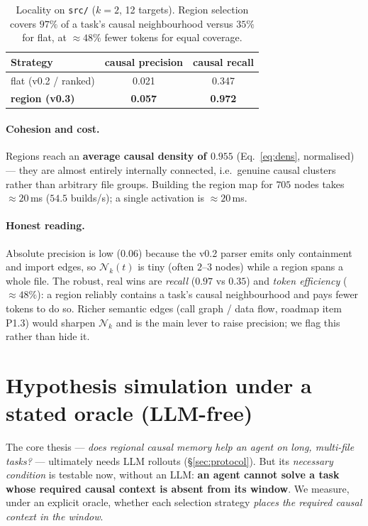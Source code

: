 \documentclass[11pt]{article}
\newcommand{\Nk}{\mathcal{N}_k}
\newcommand{\code}[1]{\texttt{#1}}
\begin{document}
\begin{table}[h]
\centering
\begin{tabular}{lcc}
\toprule
Strategy & causal precision & causal recall \\
\midrule
flat (v0.2 / ranked) & 0.021 & 0.347 \\
\textbf{region (v0.3)} & \textbf{0.057} & \textbf{0.972} \\
\bottomrule
\end{tabular}
\caption{Locality on \code{src/} ($k=2$, 12 targets). Region selection covers
$97\%$ of a task's causal neighbourhood versus $35\%$ for flat, at
$\approx\!48\%$ fewer tokens for equal coverage.}
\label{tab:locality}
\end{table}

\paragraph{Cohesion and cost.} Regions reach an \textbf{average causal density of
$0.955$} (Eq.~\ref{eq:dens}, normalised) --- they are almost entirely internally
connected, i.e.\ genuine causal clusters rather than arbitrary file groups.
Building the region map for $705$ nodes takes $\approx\!20$\,ms
($54.5$ builds/s); a single activation is $\approx\!20$\,ms.

\paragraph{Honest reading.} Absolute precision is low ($0.06$) because the v0.2
parser emits only containment and import edges, so $\Nk(t)$ is tiny (often $2$--$3$
nodes) while a region spans a whole file. The robust, real wins are
\emph{recall} ($0.97$ vs $0.35$) and \emph{token efficiency} ($\approx\!48\%$):
a region reliably contains a task's causal neighbourhood and pays fewer tokens to
do so. Richer semantic edges (call graph / data flow, roadmap item P1.3) would
sharpen $\Nk$ and is the main lever to raise precision; we flag this rather than
hide it.

\section{Hypothesis simulation under a stated oracle (LLM-free)}\label{sec:sim}

The core thesis --- \emph{does regional causal memory help an agent on long,
multi-file tasks?} --- ultimately needs LLM rollouts (\S\ref{sec:protocol}). But
its \emph{necessary condition} is testable now, without an LLM: \textbf{an agent
cannot solve a task whose required causal context is absent from its window}. We
measure, under an explicit oracle, whether each selection strategy \emph{places
the required causal context in the window}.
\end{document}
